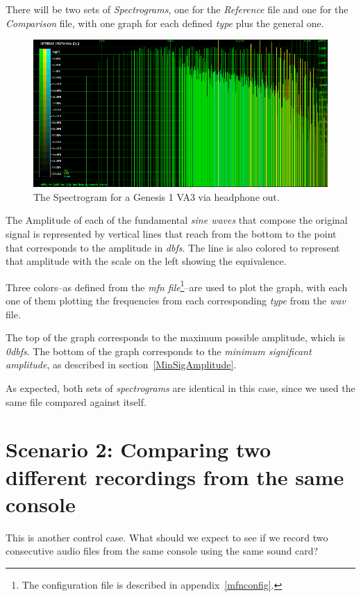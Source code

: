 \documentclass[10pt,a4paper]{report}
\newcommand{\ac}[1]{\textit{\mbox{\acrshort{#1}}}}
\newcommand{\db}[1]{\textit{\mbox{#1\acrshort{dbfs}}}}
\begin{document}
There will be two sets of \textit{Spectrograms}, one for the \textit{Reference} file and one for the \textit{Comparison} file, with one graph for each defined \textit{type} plus the general one.

\begin{figure}[H]
	\centering
	\includegraphics[width=1.0\linewidth]{images/interpretation/Plot1-SameFile-Spectrogram.png}
	\caption[Spectrogram]{The Spectrogram for a Genesis 1 VA3 via headphone out.}
	\label{fig:plot2-samefile-fm-spectrogram}
\end{figure}

The Amplitude of each of the fundamental \textit{sine waves} that compose the original signal is represented by vertical lines that reach from the bottom to the point that corresponds to the amplitude in \ac{dbfs}. The line is also colored to represent that amplitude with the scale on the left showing the equivalence.

Three colors--as defined from the \textit{mfn file}\footnote{The configuration file is described in appendix~\ref{mfnconfig}.}--are used to plot the graph, with each one of them plotting the frequencies from each corresponding \textit{type} from the \ac{wav} file.

The top of the graph corresponds to the maximum possible amplitude, which is \db{0}. The bottom of the graph corresponds to the \textit{minimum significant amplitude}, as described in section~\ref{MinSigAmplitude}.

As expected, both sets of \textit{spectrograms} are identical in this case, since we used the same file compared against itself.

\section{Scenario 2: Comparing two different recordings from the same console}
\label{scenario2}
This is another control case. What should we expect to see if we record two consecutive audio files from the same console using the same sound card?
\end{document}
